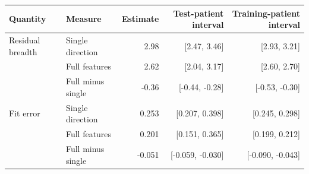 \begin{tabular}{@{}llrrr@{}}
\toprule
Quantity & Measure & Estimate & Test-patient interval & Training-patient interval \\
\midrule
Residual breadth & Single direction & 2.98 & [2.47, 3.46] & [2.93, 3.21] \\
 & Full features & 2.62 & [2.04, 3.17] & [2.60, 2.70] \\
 & Full minus single & -0.36 & [-0.44, -0.28] & [-0.53, -0.30] \\
\midrule
Fit error & Single direction & 0.253 & [0.207, 0.398] & [0.245, 0.298] \\
 & Full features & 0.201 & [0.151, 0.365] & [0.199, 0.212] \\
 & Full minus single & -0.051 & [-0.059, -0.030] & [-0.090, -0.043] \\
\bottomrule
\end{tabular}

